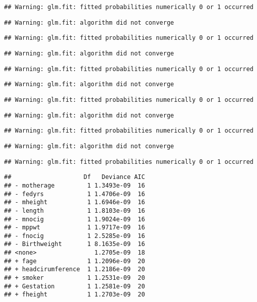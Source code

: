 \documentclass[]{article}
\begin{document}
\begin{verbatim}
## Warning: glm.fit: fitted probabilities numerically 0 or 1 occurred
\end{verbatim}

\begin{verbatim}
## Warning: glm.fit: algorithm did not converge
\end{verbatim}

\begin{verbatim}
## Warning: glm.fit: fitted probabilities numerically 0 or 1 occurred
\end{verbatim}

\begin{verbatim}
## Warning: glm.fit: algorithm did not converge
\end{verbatim}

\begin{verbatim}
## Warning: glm.fit: fitted probabilities numerically 0 or 1 occurred
\end{verbatim}

\begin{verbatim}
## Warning: glm.fit: algorithm did not converge
\end{verbatim}

\begin{verbatim}
## Warning: glm.fit: fitted probabilities numerically 0 or 1 occurred
\end{verbatim}

\begin{verbatim}
## Warning: glm.fit: algorithm did not converge
\end{verbatim}

\begin{verbatim}
## Warning: glm.fit: fitted probabilities numerically 0 or 1 occurred
\end{verbatim}

\begin{verbatim}
## Warning: glm.fit: algorithm did not converge
\end{verbatim}

\begin{verbatim}
## Warning: glm.fit: fitted probabilities numerically 0 or 1 occurred
\end{verbatim}

\begin{verbatim}
##                    Df   Deviance AIC
## - motherage         1 1.3493e-09  16
## - fedyrs            1 1.4706e-09  16
## - mheight           1 1.6946e-09  16
## - length            1 1.8103e-09  16
## - mnocig            1 1.9024e-09  16
## - mppwt             1 1.9717e-09  16
## - fnocig            1 2.5285e-09  16
## - Birthweight       1 8.1635e-09  16
## <none>                1.2705e-09  18
## + fage              1 1.2096e-09  20
## + headcirumference  1 1.2186e-09  20
## + smoker            1 1.2531e-09  20
## + Gestation         1 1.2581e-09  20
## + fheight           1 1.2703e-09  20
\end{verbatim}
\end{document}
